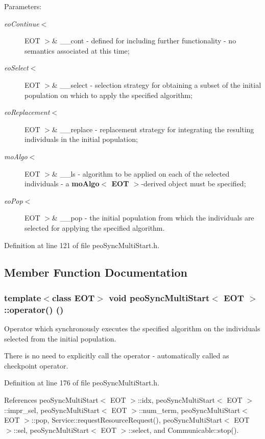 \begin{Desc}
\item[Parameters:]
\begin{description}
\item[{\em eo\-Continue$<$}]EOT $>$\& \_\-\_\-cont - defined for including further functionality - no semantics associated at this time; \item[{\em eo\-Select$<$}]EOT $>$\& \_\-\_\-select - selection strategy for obtaining a subset of the initial population on which to apply the specified algorithm; \item[{\em eo\-Replacement$<$}]EOT $>$\& \_\-\_\-replace - replacement strategy for integrating the resulting individuals in the initial population; \item[{\em mo\-Algo$<$}]EOT $>$\& \_\-\_\-ls - algorithm to be applied on each of the selected individuals - a {\bf mo\-Algo$<$ EOT $>$}-derived object must be specified; \item[{\em eo\-Pop$<$}]EOT $>$\& \_\-\_\-pop - the initial population from which the individuals are selected for applying the specified algorithm. \end{description}
\end{Desc}


Definition at line 121 of file peo\-Sync\-Multi\-Start.h.

\subsection{Member Function Documentation}
\subsubsection{\setlength{\rightskip}{0pt plus 5cm}template$<$class EOT$>$ void {\bf peo\-Sync\-Multi\-Start}$<$ EOT $>$::operator() ()}\label{classpeo_sync_multi_start_76385b33fe514f91cb83f0fbecbeb3c2}


Operator which synchronously executes the specified algorithm on the individuals selected from the initial population. 

There is no need to explicitly call the operator - automatically called as checkpoint operator. 

Definition at line 176 of file peo\-Sync\-Multi\-Start.h.

References peo\-Sync\-Multi\-Start$<$ EOT $>$::idx, peo\-Sync\-Multi\-Start$<$ EOT $>$::impr\_\-sel, peo\-Sync\-Multi\-Start$<$ EOT $>$::num\_\-term, peo\-Sync\-Multi\-Start$<$ EOT $>$::pop, Service::request\-Resource\-Request(), peo\-Sync\-Multi\-Start$<$ EOT $>$::sel, peo\-Sync\-Multi\-Start$<$ EOT $>$::select, and Communicable::stop().
